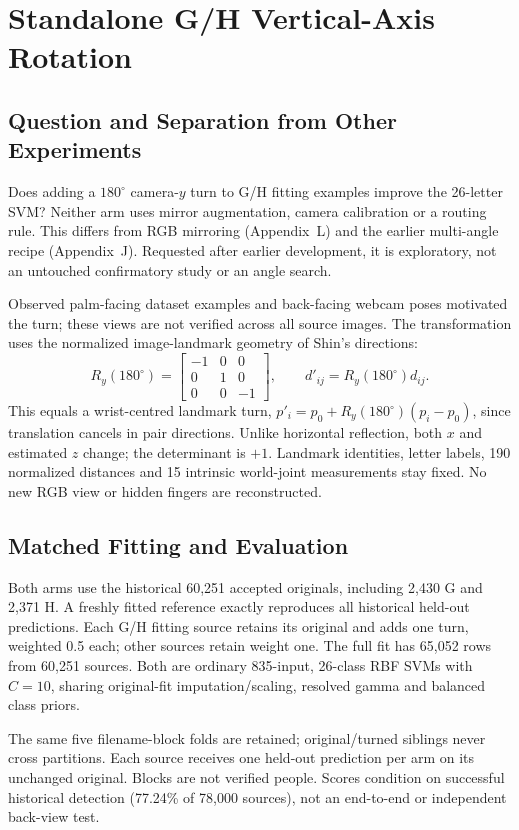\section{Standalone G/H Vertical-Axis Rotation}\label{app:gh-y180}
\subsection{Question and Separation from Other Experiments}
Does adding a $180^\circ$ camera-$y$ turn to G/H fitting examples improve the 26-letter SVM? Neither arm uses mirror augmentation, camera calibration or a routing rule. This differs from RGB mirroring (Appendix~L) and the earlier multi-angle recipe (Appendix~J). Requested after earlier development, it is exploratory, not an untouched confirmatory study or an angle search.

Observed palm-facing dataset examples and back-facing webcam poses motivated the turn; these views are not verified across all source images. The transformation uses the normalized image-landmark geometry of Shin's directions:
\[
R_y(180^\circ)=\begin{bmatrix}-1&0&0\\0&1&0\\0&0&-1\end{bmatrix},
\qquad d'_{ij}=R_y(180^\circ)d_{ij}.
\]
This equals a wrist-centred landmark turn, $p'_i=p_0+R_y(180^\circ)(p_i-p_0)$, since translation cancels in pair directions. Unlike horizontal reflection, both $x$ and estimated $z$ change; the determinant is $+1$. Landmark identities, letter labels, 190 normalized distances and 15 intrinsic world-joint measurements stay fixed. No new RGB view or hidden fingers are reconstructed.

\subsection{Matched Fitting and Evaluation}
Both arms use the historical 60,251 accepted originals, including 2,430 G and 2,371 H. A freshly fitted reference exactly reproduces all historical held-out predictions. Each G/H fitting source retains its original and adds one turn, weighted 0.5 each; other sources retain weight one. The full fit has 65,052 rows from 60,251 sources. Both are ordinary 835-input, 26-class RBF SVMs with $C=10$, sharing original-fit imputation/scaling, resolved gamma and balanced class priors.

The same five filename-block folds are retained; original/turned siblings never cross partitions. Each source receives one held-out prediction per arm on its unchanged original. Blocks are not verified people. Scores condition on successful historical detection (77.24\% of 78,000 sources), not an end-to-end or independent back-view test.

